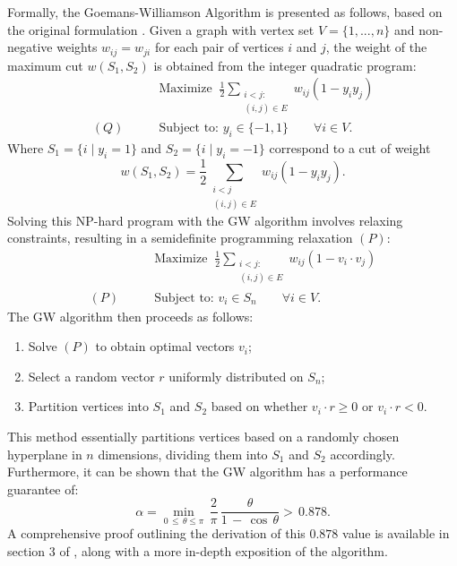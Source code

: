 Formally, the Goemans-Williamson Algorithm is presented as follows, based on the original formulation \cite{GW-Algorithm}. Given a graph with vertex set \( V = \{1, ..., n\} \) and non-negative weights \( w_{ij} = w_{ji} \) for each pair of vertices \( i \) and \( j \), the weight of the maximum cut \( w(S_1, S_2) \) is obtained from the integer quadratic program:
\begin{equation}
    \begin{aligned}\label{eq:GW_Q}
      &\text{Maximize}\;\;\frac{1}{2}\sum_{\substack{i < j: \\ (i,j)\in E}}w_{i j}(1-y_{i}y_{j}) \\
      (Q)\qquad&\text{Subject to: }y_{i}\in\{-1,1\}\qquad\forall i\in V.
    \end{aligned}
\end{equation}
Where \( S_1 = \{i \mid y_i = 1\} \) and \( S_2 = \{i \mid y_i = -1\} \) correspond to a cut of weight
\begin{equation}
w(S_1, S_2) = \frac{1}{2} \sum_{\substack{i < j \\ (i,j) \in E}} w_{ij} \left(1 - y_i y_j\right).
\end{equation}
Solving this NP-hard program with the GW algorithm involves relaxing constraints, resulting in a semidefinite programming relaxation \((P)\):
\begin{equation}
    \begin{aligned}
      &\text{Maximize}\;\;\frac{1}{2}\sum_{\substack{i < j: \\ (i,j)\in E}}w_{i j}(1-v_{i} \cdot v_{j}) \\
      (P)\qquad&\text{Subject to: }v_{i}\in S_n \qquad\forall i\in V.
    \end{aligned}
    \end{equation}    
The GW algorithm then proceeds as follows:
\begin{enumerate}
  \item Solve \((P)\) to obtain optimal vectors \( v_{i} \);
  \item Select a random vector \( r \) uniformly distributed on \( S_n \);
  \item Partition vertices into \( S_1 \) and \( S_2 \) based on whether \( v_{i} \cdot r \geq 0 \) or \( v_{i} \cdot r < 0 \).
\end{enumerate}
This method essentially partitions vertices based on a randomly chosen hyperplane in \( n \) dimensions, dividing them into \( S_1 \) and \( S_2 \) accordingly. Furthermore, it can be shown that the GW algorithm has a performance guarantee of:
\begin{equation}
  \alpha=\operatorname*{min}_{0\,\leq\,\theta\leq\pi}\,\frac{2}{\pi}\,\frac{\theta}{1\,-\,\cos\,\theta} > \,0.878.
\end{equation}
A comprehensive proof outlining the derivation of this $0.878$ value is available in section $3$ of \cite{GW-Algorithm}, along with a more in-depth exposition of the algorithm.

